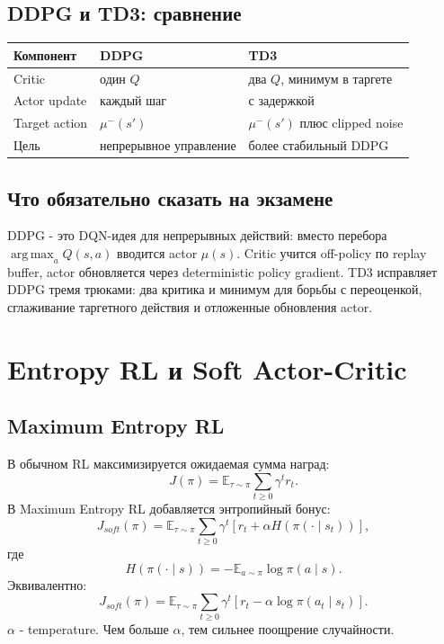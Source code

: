\documentclass[11pt,a4paper]{article}
\newcommand{\E}{\mathbb{E}}
\newcommand{\argmax}{\operatorname*{arg\,max}}
\newcommand{\1}{\mathbf{1}}
\begin{document}
\subsection*{DDPG и TD3: сравнение}
\begin{center}
\begin{tabular}{p{4cm}p{5cm}p{5cm}}
\toprule
Компонент & DDPG & TD3 \\
\midrule
Critic & один $Q$ & два $Q$, минимум в таргете \\
Actor update & каждый шаг & с задержкой \\
Target action & $\mu^-(s')$ & $\mu^-(s')$ плюс clipped noise \\
Цель & непрерывное управление & более стабильный DDPG \\
\bottomrule
\end{tabular}
\end{center}

\subsection*{Что обязательно сказать на экзамене}
DDPG - это DQN-идея для непрерывных действий: вместо перебора $\argmax_a Q(s,a)$ вводится actor $\mu(s)$. Critic учится off-policy по replay buffer, actor обновляется через deterministic policy gradient. TD3 исправляет DDPG тремя трюками: два критика и минимум для борьбы с переоценкой, сглаживание таргетного действия и отложенные обновления actor.

\newpage
\section{Entropy RL и Soft Actor-Critic}

\subsection*{Maximum Entropy RL}
В обычном RL максимизируется ожидаемая сумма наград:
\[
    J(\pi)=\E_{\tau\sim\pi}\sum_{t\ge0}\gamma^t r_t.
\]
В Maximum Entropy RL добавляется энтропийный бонус:
\[
    J_{soft}(\pi)=\E_{\tau\sim\pi}\sum_{t\ge0}\gamma^t
    \left[r_t+\alpha H(\pi(\cdot\mid s_t))\right],
\]
где
\[
    H(\pi(\cdot\mid s))=-\E_{a\sim\pi}\log\pi(a\mid s).
\]
Эквивалентно:
\[
    J_{soft}(\pi)=\E_{\tau\sim\pi}\sum_{t\ge0}\gamma^t
    \left[r_t-\alpha\log\pi(a_t\mid s_t)\right].
\]
$\alpha$ - temperature. Чем больше $\alpha$, тем сильнее поощрение случайности.
\end{document}
